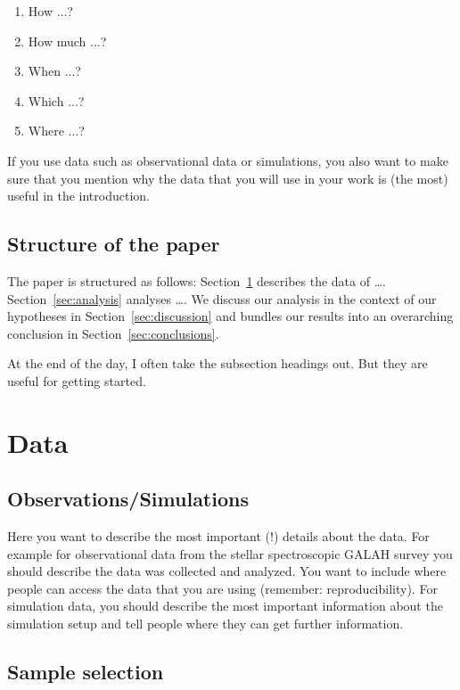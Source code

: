 \documentclass[twocolumn,apj,numberedappendix,appendixfloats]{openjournal}
\begin{document}
\begin{enumerate}
    \item How ...?
    \item How much ...?
    \item When ...?
    \item Which ...?
    \item Where ...?
\end{enumerate}

If you use data such as observational data or simulations, you also want to make sure that you mention why the data that you will use in your work is (the most) useful in the introduction.

\subsection{Structure of the paper}

The paper is structured as follows: Section~\ref{sec:data} describes the data of \dots. Section~\ref{sec:analysis} analyses \dots. We discuss our analysis in the context of our hypotheses in Section~\ref{sec:discussion} and bundles our results into an overarching conclusion in Section~\ref{sec:conclusions}.

At the end of the day, I often take the subsection headings out. But they are useful for getting started.
\clearpage
\section{Data} \label{sec:data}

\subsection{Observations/Simulations}

Here you want to describe the most important (!) details about the data. For example for observational data from the stellar spectroscopic GALAH survey \citep{Buder2018, Buder2021, Buder2024b} you should describe the data was collected and analyzed. You want to include where people can access the data that you are using (remember: reproducibility). For simulation data, you should describe the most important information about the simulation setup and tell people where they can get further information.

\subsection{Sample selection}
\end{document}
